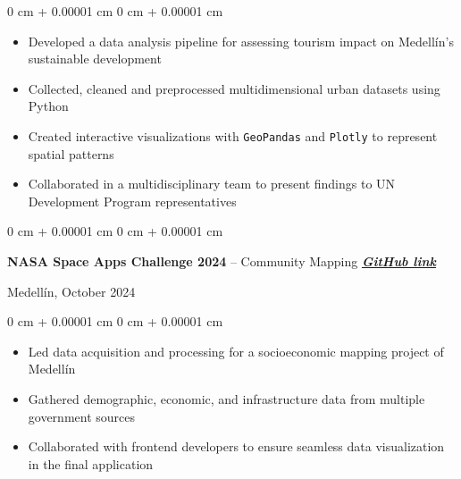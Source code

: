 \documentclass[10pt, letterpaper]{article}
\newenvironment{highlights}{
    \begin{itemize}[
        topsep=0.10 cm,
        parsep=0.10 cm,
        partopsep=0pt,
        itemsep=0pt,
        leftmargin=0 cm + 10pt
    ]
}{
    \end{itemize}
}
\newenvironment{onecolentry}{
    \begin{adjustwidth}{
        0 cm + 0.00001 cm
    }{
        0 cm + 0.00001 cm
    }
}{
    \end{adjustwidth}
}
\newenvironment{twocolentry}[2][]{
    \onecolentry
    \def\secondColumn{#2}
    \setcolumnwidth{\fill, 4.5 cm}
    \begin{paracol}{2}
}{
    \switchcolumn \raggedleft \secondColumn
    \end{paracol}
    \endonecolentry
}
\begin{document}
    \vspace{0.10 cm}
    \begin{onecolentry}
        \begin{highlights}
            \item Developed a data analysis pipeline for assessing tourism impact on Medellín's sustainable development
            \item Collected, cleaned and preprocessed multidimensional urban datasets using Python
            \item Created interactive visualizations with \texttt{GeoPandas} and \texttt{Plotly} to represent spatial patterns
            \item Collaborated in a multidisciplinary team to present findings to UN Development Program representatives
        \end{highlights}
    \end{onecolentry}

    \begin{twocolentry}{
        Medellín, October 2024
    }
        \textbf{NASA Space Apps Challenge 2024} -- Community Mapping
        \textbf{\textit{\href{https://github.com/tonnysoyyo/NASA-Space-Apps}{GitHub link}}}
    \end{twocolentry}

    \vspace{0.10 cm}
    \begin{onecolentry}
        \begin{highlights}
            \item Led data acquisition and processing for a socioeconomic mapping project of Medellín
            \item Gathered demographic, economic, and infrastructure data from multiple government sources
            \item Collaborated with frontend developers to ensure seamless data visualization in the final application
        \end{highlights}
    \end{onecolentry}
\end{document}

